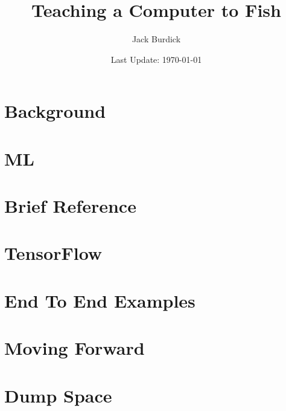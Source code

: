 \documentclass[12pt]{book}
\title{Teaching a Computer to Fish}
\author{Jack Burdick}
\date{Last Update: \today} %
\begin{document}
 
	
\frontmatter

\maketitle 

\tableofcontents


\mainmatter

\part{Background}








\part{ML}









\part{Brief Reference}




\part{TensorFlow}




\part{End To End Examples}




\part{Moving Forward}




\part{Dump Space}
\end{document}
